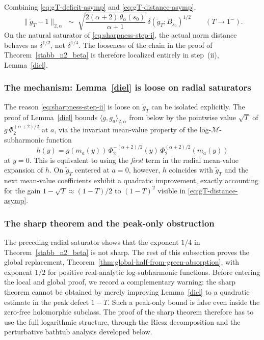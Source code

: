 \documentclass[a4paper,10pt]{amsart}
\begin{document}
Combining \eqref{eq:gT-deficit-asymp} and \eqref{eq:gT-distance-asymp},
\[
\|\widetilde g_T-1\|_{2,\alpha}
\;\sim\;
\sqrt{\frac{2(\alpha+2)\,\theta_\alpha(s_0)}{\alpha+1}}\,
\delta(\widetilde g_T;B_{s_0})^{1/2}
\qquad (T\to 1^-).
\]
On the natural saturator of \eqref{eq:sharpness-step-i}, the actual norm
distance behaves as $\delta^{1/2}$, not $\delta^{1/4}$. The looseness of
the chain in the proof of Theorem~\ref{stabb_n2_beta} is therefore localized
entirely in step~(ii), Lemma~\ref{diel}.

\subsubsection*{The mechanism: Lemma~\ref{diel} is loose on radial saturators}

The reason \eqref{eq:sharpness-step-ii} is loose on $\widetilde g_T$ can be
isolated explicitly. The proof of Lemma~\ref{diel} bounds
$\langle g,g_a\rangle_{2,\alpha}$ from below by the pointwise value $\sqrt T$
of $g\,\Phi_2^{(\alpha+2)/2}$ at $a$, via the invariant mean-value property of
the log-$\mathcal M$-subharmonic function
\[
h(y)=g(m_a(y))\,\Phi_2^{-(\alpha+2)/2}(y)\,\Phi_2^{(\alpha+2)/2}(m_a(y))
\]
at $y=0$. This is equivalent to using the \emph{first} term in the radial
mean-value expansion of $h$. On $\widetilde g_T$ centered at $a=0$, however,
$h$ coincides with $\widetilde g_T$ and the next mean-value coefficients
exhibit a quadratic improvement, exactly accounting for the gain
$1-\sqrt T\approx (1-T)/2$ to $(1-T)^2$ visible in \eqref{eq:gT-distance-asymp}.

\subsubsection*{The sharp theorem and the peak-only obstruction}

The preceding radial saturator shows that the exponent $1/4$ in
Theorem~\ref{stabb_n2_beta} is not sharp. The rest of this subsection proves
the global replacement, Theorem~\ref{thm:global-half-from-green-absorption},
with exponent $1/2$ for positive real-analytic log-subharmonic functions.
Before entering the local and global proof, we record a complementary warning:
the sharp theorem cannot be obtained by merely improving Lemma~\ref{diel} to a
quadratic estimate in the peak defect $1-T$. Such a peak-only bound is false
even inside the zero-free holomorphic subclass. The proof of the sharp theorem
therefore has to use the full logarithmic structure, through the Riesz
decomposition and the perturbative bathtub analysis developed below.
\end{document}
